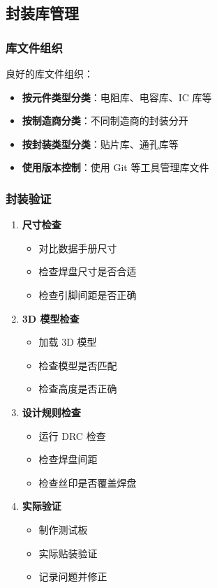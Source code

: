 \subsection{封装库管理}

\subsubsection{库文件组织}

良好的库文件组织：

\begin{itemize}
  \item \textbf{按元件类型分类}：电阻库、电容库、IC 库等
  \item \textbf{按制造商分类}：不同制造商的封装分开
  \item \textbf{按封装类型分类}：贴片库、通孔库等
  \item \textbf{使用版本控制}：使用 Git 等工具管理库文件
\end{itemize}

\subsubsection{封装验证}


\begin{enumerate}
  \item \textbf{尺寸检查}
    \begin{itemize}
      \item 对比数据手册尺寸
      \item 检查焊盘尺寸是否合适
      \item 检查引脚间距是否正确
    \end{itemize}

  \item \textbf{3D 模型检查}
    \begin{itemize}
      \item 加载 3D 模型
      \item 检查模型是否匹配
      \item 检查高度是否正确
    \end{itemize}

  \item \textbf{设计规则检查}
    \begin{itemize}
      \item 运行 DRC 检查
      \item 检查焊盘间距
      \item 检查丝印是否覆盖焊盘
    \end{itemize}

  \item \textbf{实际验证}
    \begin{itemize}
      \item 制作测试板
      \item 实际贴装验证
      \item 记录问题并修正
    \end{itemize}
\end{enumerate}

